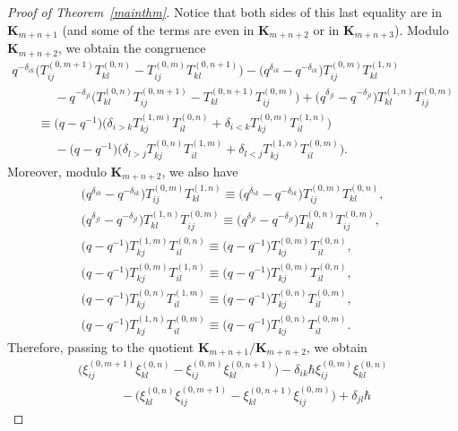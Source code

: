 \begin{proof}[Proof of Theorem~\ref{mainthm}]
Notice that both sides of this last equality are in $\mathbf{K}_{m+n+1}$ (and some of the terms are even in
$\mathbf{K}_{m+n+2}$ or in $\mathbf{K}_{m+n+3}$).
Modulo $\mathbf{K}_{m+n+2}$, we obtain the congruence
\begin{gather*}
q^{-\delta_{ik}} \big(T_{ij}^{(0,m+1)} T_{kl}^{(0,n)}- T_{ij}^{(0,m)} T_{kl}^{(0,n+1)} \big) - \big(q^{\delta_{ik}} -
q^{-\delta_{ik}}\big) T_{ij}^{(0,m)} T_{kl}^{(1,n)}
\\
\qquad\phantom{=}{}
  - q^{-\delta_{jl}} \big(T_{kl}^{(0,n)} T_{ij}^{(0,m+1)} - T_{kl}^{(0,n+1)} T_{ij}^{(0,m)} \big) + \big(q^{\delta_{jl}} -
q^{-\delta_{jl}}\big) T_{kl}^{(1,n)} T_{ij}^{(0,m)}
\\
\qquad
\equiv \big(q-q^{-1}\big) \big(  \delta_{i>k} T_{kj}^{(1,m)} T_{il}^{(0,n)} + \delta_{i<k} T_{kj}^{(0,m)} T_{il}^{(1,n)}\big)
\\
\qquad\phantom{=}{}
  - \big(q-q^{-1}\big) \big(\delta_{l>j} T_{kj}^{(0,n)} T_{il}^{(1,m)} + \delta_{l<j} T_{kj}^{(1,n)} T_{il}^{(0,m)}\big).
\end{gather*}
Moreover, modulo $\mathbf{K}_{m+n+2}$, we also have
\begin{gather*}
\big(q^{\delta_{ik}} - q^{-\delta_{ik}}\big) T_{ij}^{(0,m)} T_{kl}^{(1,n)} \equiv \big(q^{\delta_{ik}} - q^{-\delta_{ik}}\big)
T_{ij}^{(0,m)} T_{kl}^{(0,n)},
\\
\big(q^{\delta_{jl}}-q^{-\delta_{jl}}\big) T_{kl}^{(1,n)} T_{ij}^{(0,m)} \equiv \big(q^{\delta_{jl}}-q^{-\delta_{jl}}\big)
T_{kl}^{(0,n)} T_{ij}^{(0,m)},
\\
\big(q-q^{-1}\big) T_{kj}^{(1,m)} T_{il}^{(0,n)} \equiv \big(q-q^{-1}\big)T_{kj}^{(0,m)} T_{il}^{(0,n)},
\\
\big(q-q^{-1}\big) T_{kj}^{(0,m)}
T_{il}^{(1,n)} \equiv \big(q-q^{-1}\big) T_{kj}^{(0,m)} T_{il}^{(0,n)},
\\
\big(q-q^{-1}\big) T_{kj}^{(0,n)} T_{il}^{(1,m)} \equiv \big(q-q^{-1}\big) T_{kj}^{(0,n)} T_{il}^{(0,m)},
\\
\big(q-q^{-1}\big) T_{kj}^{(1,n)}
T_{il}^{(0,m)} \equiv \big(q-q^{-1}\big) T_{kj}^{(0,n)} T_{il}^{(0,m)}.
\end{gather*}
Therefore, passing to the quotient $\mathbf{K}_{m+n+1}/\mathbf{K}_{m+n+2}$, we obtain
\begin{gather*}
\big(\xi_{ij}^{(0,m+1)} \xi_{kl}^{(0,n)} - \xi_{ij}^{(0,m)} \xi_{kl}^{(0,n+1)} \big)- \delta_{ik} \hbar
\xi_{ij}^{(0,m)} \xi_{kl}^{(0,n)}
\\
\qquad\phantom{=}{}
  - \big(\xi_{kl}^{(0,n)} \xi_{ij}^{(0,m+1)} - \xi_{kl}^{(0,n+1)} \xi_{ij}^{(0,m)} \big) + \delta_{jl} \hbar

\end{gather*}
\end{proof}
